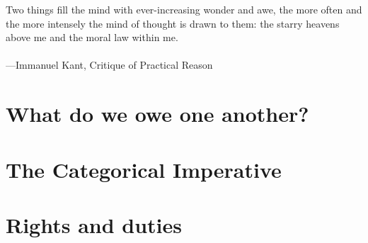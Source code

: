 \documentclass[12pt, openany]{book}
\newenvironment{epigraph}%
{
\begin{flushright}
\begin{minipage}{30em}
\begin{flushright}
\itshape
}%
{
\end{flushright}
\end{minipage}
\end{flushright}
\vspace{1em}
}
\begin{document}
\begin{epigraph}

Two things fill the mind with ever-increasing wonder and awe, the more often and the more intensely the mind of thought is drawn to them: the starry heavens above me and the moral law within me.\\
~\\
---Immanuel Kant, Critique of Practical Reason

\end{epigraph}

\hypertarget{what-do-we-owe-one-another}{%
\section{What do we owe one another?}\label{what-do-we-owe-one-another}}

\hypertarget{the-categorical-imperative}{%
\section{The Categorical Imperative}\label{the-categorical-imperative}}

\hypertarget{rights-and-duties}{%
\section{Rights and duties}\label{rights-and-duties}}


\end{document}
